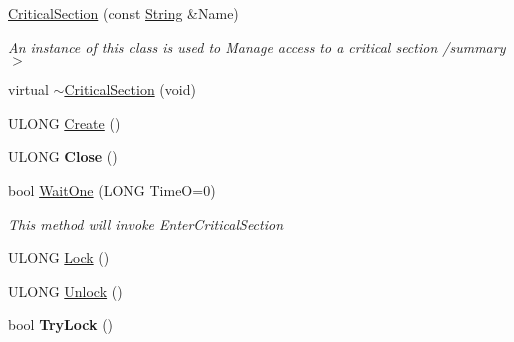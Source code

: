 \begin{DoxyCompactItemize}
\item 
\mbox{\label{class_canberra_1_1_utility_1_1_core_1_1_critical_section_abb2f8859d58ea677edec4b7f4f321b2f}} 
\hyperlink{class_canberra_1_1_utility_1_1_core_1_1_critical_section_abb2f8859d58ea677edec4b7f4f321b2f}{Critical\+Section} (const \hyperlink{class_canberra_1_1_utility_1_1_core_1_1_string}{String} \&Name)
\begin{DoxyCompactList}\small\item\em An instance of this class is used to Manage access to a critical section /summary$>$ \end{DoxyCompactList}\item 
virtual \hyperlink{class_canberra_1_1_utility_1_1_core_1_1_critical_section_a8b509ef63ce6c5d50539d2c7e1efef46_a8b509ef63ce6c5d50539d2c7e1efef46}{$\sim$\+Critical\+Section} (void)
\item 
U\+L\+O\+NG \hyperlink{class_canberra_1_1_utility_1_1_core_1_1_critical_section_a0331da73e6a8472e107813080b1ac107_a0331da73e6a8472e107813080b1ac107}{Create} ()
\item 
\mbox{\label{class_canberra_1_1_utility_1_1_core_1_1_critical_section_aa579ed1514a2d489dbb7997c199fb5ef}} 
U\+L\+O\+NG {\bfseries Close} ()
\item 
bool \hyperlink{class_canberra_1_1_utility_1_1_core_1_1_critical_section_a1f6ce2fecd7176f7580c091437920c96_a1f6ce2fecd7176f7580c091437920c96}{Wait\+One} (L\+O\+NG TimeO=0)
\begin{DoxyCompactList}\small\item\em This method will invoke Enter\+Critical\+Section \end{DoxyCompactList}\item 
U\+L\+O\+NG \hyperlink{class_canberra_1_1_utility_1_1_core_1_1_critical_section_ad6db25d94bb0c5b7f877c435c9fd9206_ad6db25d94bb0c5b7f877c435c9fd9206}{Lock} ()
\item 
U\+L\+O\+NG \hyperlink{class_canberra_1_1_utility_1_1_core_1_1_critical_section_a78d9486915ae3ed0687fd404af8bb078_a78d9486915ae3ed0687fd404af8bb078}{Unlock} ()
\item 
\mbox{\label{class_canberra_1_1_utility_1_1_core_1_1_critical_section_adacf4a030fe35e920e2ddb1515c2221d}} 
bool {\bfseries Try\+Lock} ()
\end{DoxyCompactItemize}

